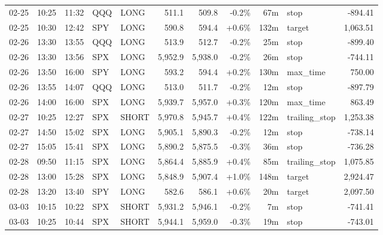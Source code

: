 \documentclass[11pt,a4paper,twoside]{article}
\begin{document}
\begin{center}
\begin{longtable}{>{\color{txtmain}}l l l l l r r r r >{\color{txtmain}}l r}
02-25 & 10:25 & 11:32 & QQQ & LONG & 511.1 & 509.8 & \textcolor{lossred}{-0.2\%} & 67m & stop & \textcolor{lossred}{-894.41} \\
02-25 & 10:30 & 12:42 & SPY & LONG & 590.8 & 594.4 & \textcolor{wingreen}{+0.6\%} & 132m & target & \textcolor{wingreen}{1,063.51} \\
02-26 & 13:30 & 13:55 & QQQ & LONG & 513.9 & 512.7 & \textcolor{lossred}{-0.2\%} & 25m & stop & \textcolor{lossred}{-899.40} \\
02-26 & 13:30 & 13:56 & SPX & LONG & 5,952.9 & 5,938.0 & \textcolor{lossred}{-0.2\%} & 26m & stop & \textcolor{lossred}{-744.11} \\
02-26 & 13:50 & 16:00 & SPY & LONG & 593.2 & 594.4 & \textcolor{wingreen}{+0.2\%} & 130m & max\_time & \textcolor{wingreen}{750.00} \\
02-26 & 13:55 & 14:07 & QQQ & LONG & 513.0 & 511.7 & \textcolor{lossred}{-0.2\%} & 12m & stop & \textcolor{lossred}{-897.79} \\
02-26 & 14:00 & 16:00 & SPX & LONG & 5,939.7 & 5,957.0 & \textcolor{wingreen}{+0.3\%} & 120m & max\_time & \textcolor{wingreen}{863.49} \\
02-27 & 10:25 & 12:27 & SPX & SHORT & 5,970.8 & 5,945.7 & \textcolor{wingreen}{+0.4\%} & 122m & trailing\_stop & \textcolor{wingreen}{1,253.38} \\
02-27 & 14:50 & 15:02 & SPX & LONG & 5,905.1 & 5,890.3 & \textcolor{lossred}{-0.2\%} & 12m & stop & \textcolor{lossred}{-738.14} \\
02-27 & 15:05 & 15:41 & SPX & LONG & 5,890.2 & 5,875.5 & \textcolor{lossred}{-0.3\%} & 36m & stop & \textcolor{lossred}{-736.28} \\
02-28 & 09:50 & 11:15 & SPX & LONG & 5,864.4 & 5,885.9 & \textcolor{wingreen}{+0.4\%} & 85m & trailing\_stop & \textcolor{wingreen}{1,075.85} \\
02-28 & 13:00 & 15:28 & SPX & LONG & 5,848.9 & 5,907.4 & \textcolor{wingreen}{+1.0\%} & 148m & target & \textcolor{wingreen}{2,924.47} \\
02-28 & 13:20 & 13:40 & SPY & LONG & 582.6 & 586.1 & \textcolor{wingreen}{+0.6\%} & 20m & target & \textcolor{wingreen}{2,097.50} \\
03-03 & 10:15 & 10:22 & SPX & SHORT & 5,931.2 & 5,946.1 & \textcolor{lossred}{-0.2\%} & 7m & stop & \textcolor{lossred}{-741.41} \\
03-03 & 10:25 & 10:44 & SPX & SHORT & 5,944.1 & 5,959.0 & \textcolor{lossred}{-0.3\%} & 19m & stop & \textcolor{lossred}{-743.01} \\

\end{longtable}
\end{center}
\end{document}
